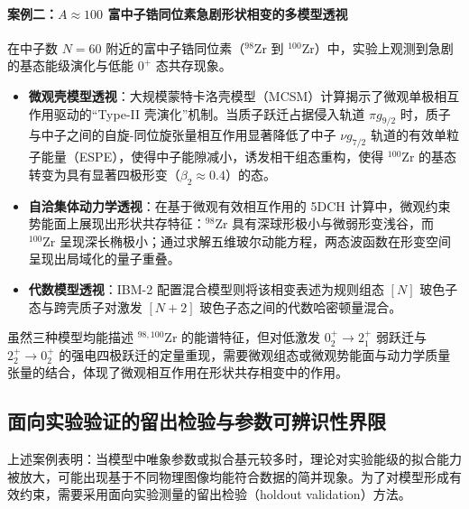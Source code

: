 \paragraph{案例二：$A \approx 100$ 富中子锆同位素急剧形状相变的多模型透视}
在中子数 $N=60$ 附近的富中子锆同位素（$^{98}\mathrm{Zr}$ 到 $^{100}\mathrm{Zr}$）中，实验上观测到急剧的基态能级演化与低能 $0^+$ 态共存现象。\cite{doctoral-r1-g28-otsuka-2023-type-ii-shell-evolution,doctoral-r1-g28-togashi-2016-zr-mcsm-qpt,Heyde_2011}
\begin{itemize}
\item \textbf{微观壳模型透视}：大规模蒙特卡洛壳模型（MCSM）计算揭示了微观单极相互作用驱动的“Type-II 壳演化”机制。当质子跃迁占据侵入轨道 $\pi g_{9/2}$ 时，质子与中子之间的自旋-同位旋张量相互作用显著降低了中子 $\nu g_{7/2}$ 轨道的有效单粒子能量（ESPE），使得中子能隙减小，诱发相干组态重构，使得 $^{100}\mathrm{Zr}$ 的基态转变为具有显著四极形变（$\beta_2 \approx 0.4$）的态。\cite{doctoral-r1-g28-otsuka-2023-type-ii-shell-evolution,doctoral-r1-g28-togashi-2016-zr-mcsm-qpt}
\item \textbf{自洽集体动力学透视}：在基于微观有效相互作用的 5DCH 计算中，微观约束势能面上展现出形状共存特征：$^{98}\mathrm{Zr}$ 具有深球形极小与微弱形变浅谷，而 $^{100}\mathrm{Zr}$ 呈现深长椭极小；通过求解五维玻尔动能方程，两态波函数在形变空间呈现出局域化的量子重叠。\cite{prochniak-rohozinski-2009-bohr-collective-hamiltonian}
\item \textbf{代数模型透视}：IBM-2 配置混合模型则将该相变表述为规则组态 $[N]$ 玻色子态与跨壳质子对激发 $[N+2]$ 玻色子态之间的代数哈密顿量混合。\cite{Heyde_2011}
\end{itemize}
虽然三种模型均能描述 $^{98,100}\mathrm{Zr}$ 的能谱特征，但对低激发 $0_2^+ \to 2_1^+$ 弱跃迁与 $2_2^+ \to 0_2^+$ 的强电四极跃迁的定量重现，需要微观组态或微观势能面与动力学质量张量的结合，体现了微观相互作用在形状共存相变中的作用。

\subsection{面向实验验证的留出检验与参数可辨识性界限}\label{sec:2-8-6}

上述案例表明：当模型中唯象参数或拟合基元较多时，理论对实验能级的拟合能力被放大，可能出现基于不同物理图像均能符合数据的简并现象。为了对模型形成有效约束，需要采用面向实验测量的留出检验（holdout validation）方法。

